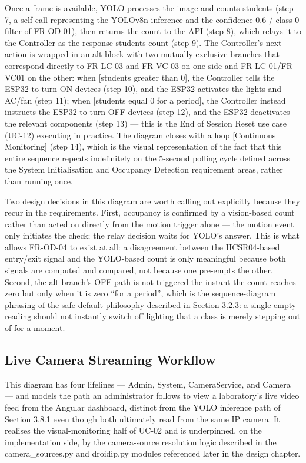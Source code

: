 Once a frame is available, YOLO processes the image and counts students (step 7, a self-call
representing the YOLOv8n inference and the confidence-0.6 / class-0 filter of FR-OD-01), then
returns the count to the API (step 8), which relays it to the Controller as the response students
count (step 9). The Controller's next action is wrapped in an alt block with two mutually exclusive
branches that correspond directly to FR-LC-03 and FR-VC-03 on one side and FR-LC-01/FR-VC01 on the other: when [students greater than 0], the Controller tells the ESP32 to turn ON devices
(step 10), and the ESP32 activates the lights and AC/fan (step 11); when [students equal 0 for a
period], the Controller instead instructs the ESP32 to turn OFF devices (step 12), and the ESP32
deactivates the relevant components (step 13) --- this is the End of Session Reset use case (UC-12)
executing in practice. The diagram closes with a loop [Continuous Monitoring] (step 14), which is
the visual representation of the fact that this entire sequence repeats indefinitely on the 5-second
polling cycle defined across the System Initialisation and Occupancy Detection requirement areas,
rather than running once.

Two design decisions in this diagram are worth calling out explicitly because they recur in the
requirements. First, occupancy is confirmed by a vision-based count rather than acted on directly
from the motion trigger alone --- the motion event only initiates the check; the relay decision waits
for YOLO's answer. This is what allows FR-OD-04 to exist at all: a disagreement between the HCSR04-based entry/exit signal and the YOLO-based count is only meaningful because both signals
are computed and compared, not because one pre-empts the other. Second, the alt branch's OFF
path is not triggered the instant the count reaches zero but only when it is zero ``for a period'',
which is the sequence-diagram phrasing of the safe-default philosophy described in Section 3.2.3: a
single empty reading should not instantly switch off lighting that a class is merely stepping out of
for a moment.

\subsection{Live Camera Streaming Workflow}

This diagram has four lifelines --- Admin, System, CameraService, and Camera --- and models the
path an administrator follows to view a laboratory's live video feed from the Angular dashboard,
distinct from the YOLO inference path of Section 3.8.1 even though both ultimately read from the
same IP camera. It realises the visual-monitoring half of UC-02 and is underpinned, on the
implementation side, by the camera-source resolution logic described in the camera_sources.py and
droidip.py modules referenced later in the design chapter.


